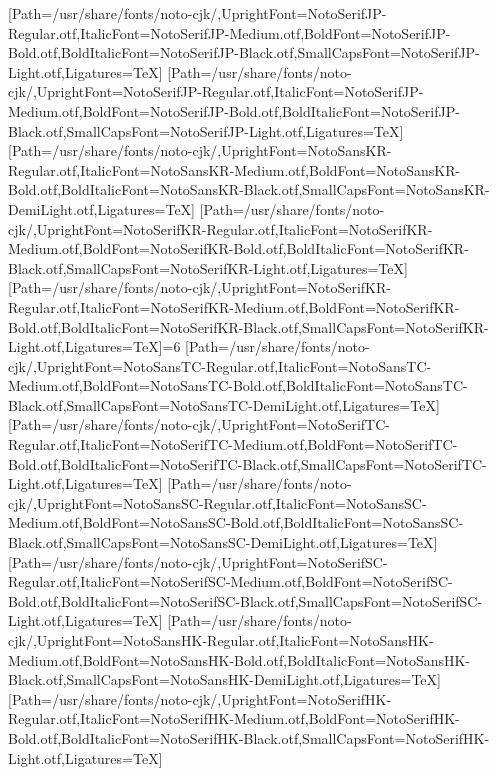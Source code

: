\newfontfamily{}[Path=/usr/share/fonts/noto-cjk/,UprightFont=NotoSerifJP-Regular.otf,ItalicFont=NotoSerifJP-Medium.otf,BoldFont=NotoSerifJP-Bold.otf,BoldItalicFont=NotoSerifJP-Black.otf,SmallCapsFont=NotoSerifJP-Light.otf,Ligatures=TeX]
\newfontfamily{}[Path=/usr/share/fonts/noto-cjk/,UprightFont=NotoSerifJP-Regular.otf,ItalicFont=NotoSerifJP-Medium.otf,BoldFont=NotoSerifJP-Bold.otf,BoldItalicFont=NotoSerifJP-Black.otf,SmallCapsFont=NotoSerifJP-Light.otf,Ligatures=TeX]
\newfontfamily{}[Path=/usr/share/fonts/noto-cjk/,UprightFont=NotoSansKR-Regular.otf,ItalicFont=NotoSansKR-Medium.otf,BoldFont=NotoSansKR-Bold.otf,BoldItalicFont=NotoSansKR-Black.otf,SmallCapsFont=NotoSansKR-DemiLight.otf,Ligatures=TeX]
\newfontfamily{}[Path=/usr/share/fonts/noto-cjk/,UprightFont=NotoSerifKR-Regular.otf,ItalicFont=NotoSerifKR-Medium.otf,BoldFont=NotoSerifKR-Bold.otf,BoldItalicFont=NotoSerifKR-Black.otf,SmallCapsFont=NotoSerifKR-Light.otf,Ligatures=TeX]
\newfontfamily{}[Path=/usr/share/fonts/noto-cjk/,UprightFont=NotoSerifKR-Regular.otf,ItalicFont=NotoSerifKR-Medium.otf,BoldFont=NotoSerifKR-Bold.otf,BoldItalicFont=NotoSerifKR-Black.otf,SmallCapsFont=NotoSerifKR-Light.otf,Ligatures=TeX]\else\ifnum\value{NotoCJKFamily}=6
\newfontfamily{}[Path=/usr/share/fonts/noto-cjk/,UprightFont=NotoSansTC-Regular.otf,ItalicFont=NotoSansTC-Medium.otf,BoldFont=NotoSansTC-Bold.otf,BoldItalicFont=NotoSansTC-Black.otf,SmallCapsFont=NotoSansTC-DemiLight.otf,Ligatures=TeX]
\newfontfamily{}[Path=/usr/share/fonts/noto-cjk/,UprightFont=NotoSerifTC-Regular.otf,ItalicFont=NotoSerifTC-Medium.otf,BoldFont=NotoSerifTC-Bold.otf,BoldItalicFont=NotoSerifTC-Black.otf,SmallCapsFont=NotoSerifTC-Light.otf,Ligatures=TeX]
\newfontfamily{}[Path=/usr/share/fonts/noto-cjk/,UprightFont=NotoSansSC-Regular.otf,ItalicFont=NotoSansSC-Medium.otf,BoldFont=NotoSansSC-Bold.otf,BoldItalicFont=NotoSansSC-Black.otf,SmallCapsFont=NotoSansSC-DemiLight.otf,Ligatures=TeX]
\newfontfamily{}[Path=/usr/share/fonts/noto-cjk/,UprightFont=NotoSerifSC-Regular.otf,ItalicFont=NotoSerifSC-Medium.otf,BoldFont=NotoSerifSC-Bold.otf,BoldItalicFont=NotoSerifSC-Black.otf,SmallCapsFont=NotoSerifSC-Light.otf,Ligatures=TeX]
\newfontfamily{}[Path=/usr/share/fonts/noto-cjk/,UprightFont=NotoSansHK-Regular.otf,ItalicFont=NotoSansHK-Medium.otf,BoldFont=NotoSansHK-Bold.otf,BoldItalicFont=NotoSansHK-Black.otf,SmallCapsFont=NotoSansHK-DemiLight.otf,Ligatures=TeX]
\newfontfamily{}[Path=/usr/share/fonts/noto-cjk/,UprightFont=NotoSerifHK-Regular.otf,ItalicFont=NotoSerifHK-Medium.otf,BoldFont=NotoSerifHK-Bold.otf,BoldItalicFont=NotoSerifHK-Black.otf,SmallCapsFont=NotoSerifHK-Light.otf,Ligatures=TeX]
